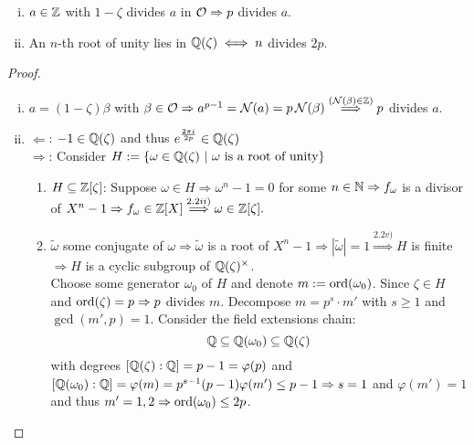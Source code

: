 \begin{Lem}
\begin{enumerate}[i)]
\item $a \in \mathbb{Z}$ with $1- \zeta$ divides $a$ in $\mathcal{O} \Rightarrow p$ divides $a$.
\item An $n$-th root of unity lies in $\mathbb{Q}(\zeta) \iff n $ divides $2p$.
\end{enumerate}
\end{Lem}
\begin{proof}
\begin{enumerate}[i)]
\item $a=(1- \zeta)\beta$ with $\beta \in \mathcal{O} \Rightarrow a^{p-1}=\operatorname{\mathcal{N}}(a)=p\operatorname{\mathcal{N}}(\beta) \stackrel{(\operatorname{\mathcal{N}}(\beta) \in \mathbb{Z})}{\Longrightarrow} p$ divides $a$.
\item \glqq $\Leftarrow$\grqq: $-1 \in \mathbb{Q}(\zeta)$ and thus $e^{\frac{2\pi i}{2p}} \in \mathbb{Q}(\zeta)$\\
\glqq $\Rightarrow$\grqq: Consider $H:=\{\omega \in \Q(\zeta) \ | \ \omega \text{ is a root of unity} \}$
\begin{enumerate}
\item $H \subseteq \mathbb{Z}[\zeta]$: Suppose $\omega \in H \Rightarrow \omega^n-1 = 0$ for some $n \in \mathbb{N} \Rightarrow f_\omega$ is a divisor of $X^n-1 \Rightarrow f_\omega \in \mathbb{Z}[X] \stackrel{2.2 ii)}{\Longrightarrow} \omega \in \mathbb{Z}[\zeta].$
\item $\tilde{\omega}$ some conjugate of $\omega \Rightarrow \tilde{\omega}$ is a root of $X^n-1 \Rightarrow |\tilde{\omega}|=1 \stackrel{2.2 v)}{\Longrightarrow} H$ is finite $\Rightarrow H$ is a cyclic subgroup of $\mathbb{Q}(\zeta)^\times$.\\
Choose some generator $\omega_0$ of $H$ and denote $m:= \operatorname{ord}(\omega_0)$. Since $\zeta \in H$ and $\operatorname{ord}(\zeta)=p \Rightarrow p$ divides $m$. Decompose $m=p^s \cdot m'$ with $s \geq 1$ and $\gcd(m',p)=1$. Consider the field extensions chain:
\[\mathbb{Q} \subseteq \mathbb{Q}(\omega_0) \subseteq \mathbb{Q}(\zeta)\]
with degrees $[\mathbb{Q}(\zeta):\mathbb{Q}]=p-1=\varphi(p)$ and $[\Q(\omega_0):\Q]=\varphi(m) = \linebreak p^{s-1}(p-1)\varphi(m') \leq p-1 \Rightarrow s=1$ and $\varphi(m')=1$ and thus $m'=1,2 \Rightarrow \operatorname{ord}(\omega_0) \leq 2p$.
\end{enumerate}
\end{enumerate}
\end{proof}

